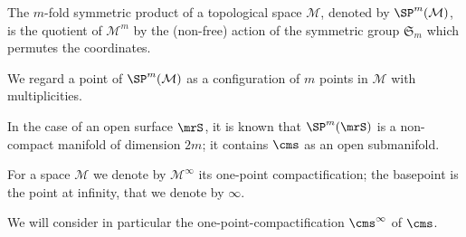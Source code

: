 \begin{defn}
 \label{defn:SP}
 The $m$-fold symmetric product of a topological space $\mathcal{M}$, denoted by $\SP^m(\mathcal{M})$, is
 the quotient of $\mathcal{M}^m$ by the (non-free) action of the symmetric group $\mathfrak{S}_m$
 which permutes the coordinates.
\end{defn}
We regard a point of $\SP^m(\mathcal{M})$ as a configuration of $m$ points in $\mathcal{M}$ with multiplicities.

In the case of an open surface $\mrS$, it is known that $\SP^m(\mrS)$ is a non-compact manifold of dimension $2m$;
it contains $\cms$ as an open submanifold.

\begin{defn}
 \label{defn:opc}
For a space $\mathcal{M}$ we denote by $\mathcal{M}^{\infty}$ its one-point
compactification; the basepoint is the point at infinity, that we denote by $\infty$.
\end{defn}


We will consider in particular the one-point-compactification $\cms^{\infty}$ of $\cms$.
